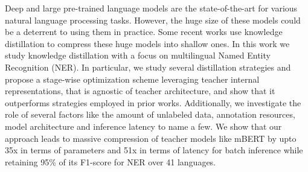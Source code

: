 Deep and large pre-trained language models are the state-of-the-art for various natural language processing tasks. However, the huge size of these models could be a deterrent to using them in practice. Some recent works use knowledge distillation to compress these huge models into shallow ones. In this work we study knowledge distillation with a focus on multilingual Named Entity Recognition (NER). In particular, we study several distillation strategies and propose a stage-wise optimization scheme leveraging teacher internal representations, that is agnostic of teacher architecture, and show that it outperforms strategies employed in prior works. Additionally, we investigate the role of several factors like the amount of unlabeled data, annotation resources, model architecture and inference latency to name a few. We show that our approach leads to massive compression of teacher models like mBERT by upto 35x in terms of parameters and 51x in terms of latency for batch inference while retaining 95\% of its F1-score for NER over 41 languages.
